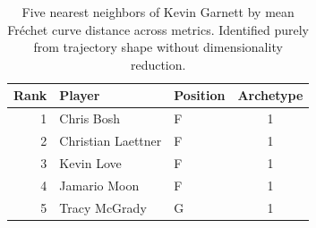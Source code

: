 \begin{table}[htbp]
  \centering\small
  \begin{tabular}{rllc}
    \toprule
    Rank & Player & Position & Archetype \\
    \midrule
    1 & Chris Bosh & F & 1 \\
    2 & Christian Laettner & F & 1 \\
    3 & Kevin Love & F & 1 \\
    4 & Jamario Moon & F & 1 \\
    5 & Tracy McGrady & G & 1 \\
    \bottomrule
  \end{tabular}
  \caption{Five nearest neighbors of Kevin Garnett by mean Fr\'{e}chet curve distance across metrics. Identified purely from trajectory shape without dimensionality reduction.}
  \label{tab:Kevin_Garnett_frechet_curve_neighbors}
\end{table}


